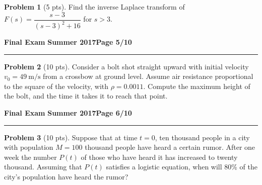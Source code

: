 \documentclass[12pt]{article}
\theoremstyle{definition}
\newtheorem{problem}{Problem}
\begin{document}
\begin{problem}[5 pts]
Find the inverse Laplace transform of $F(s) =\dfrac{s-3}{(s-3)^2+16}$ for $s>3$.
\vspace{2cm}
\begin{flushright}
\end{flushright} 

\end{problem}
\newpage

\hfill{\large\bf Final Exam}\hfill{\large\bf
Summer 2017}\hfill{\large\bf Page 5/10}\hrule

\bigskip
\begin{problem}[10 pts]
Consider a bolt shot straight upward with initial velocity $v_0=49~\mathrm{m}/\mathrm{s}$ from a crossbow at ground level.  Assume air resistance proportional to the square of the velocity, with $\rho = 0.0011$.  Compute the maximum height of the bolt, and the time it takes it to reach that point.
\vspace{19cm}
\begin{flushright}
\end{flushright}
\end{problem}
\newpage

\hfill{\large\bf Final Exam}\hfill{\large\bf
Summer 2017}\hfill{\large\bf Page 6/10}\hrule

\bigskip
\begin{problem}[10 pts]
Suppose that at time $t = 0$, ten thousand people in a city with population $M = 100$ thousand people have heard a certain rumor. After one week the number $P(t)$ of those who have heard it has increased to twenty thousand. Assuming that $P(t)$ satisfies a logistic equation, when will 80\% of the city's population have heard the rumor?
\vspace{19.5cm}
\begin{flushright}
\end{flushright}
\end{problem}
\newpage
\end{document}
